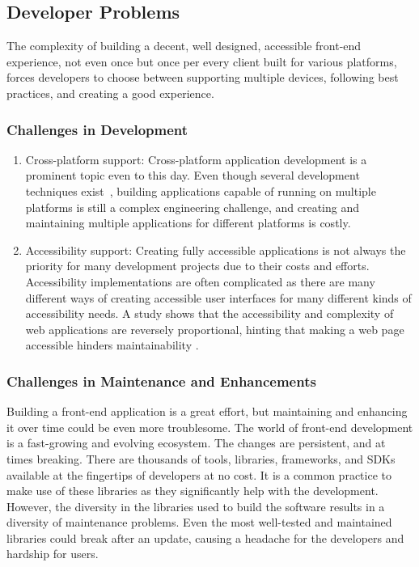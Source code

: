 \subsection{Developer Problems}

The complexity of building a decent, well designed, accessible front-end experience, not even once but once per every client built for various platforms, forces developers to choose between supporting multiple devices, following best practices, and creating a good experience.

\subsubsection{Challenges in Development}
\begin{enumerate}
  \item Cross-platform support:
  Cross-platform application development is a prominent topic even to this day. Even though several development techniques exist~\cite{PWAs}, building applications capable of running on multiple platforms is still a complex engineering challenge, and creating and maintaining multiple applications for different platforms is costly. 
  \item Accessibility support:
  Creating fully accessible applications is not always the priority for many development projects due to their costs and efforts. Accessibility implementations are often complicated as there are many different ways of creating accessible user interfaces for many different kinds of accessibility needs. A study shows that the accessibility and complexity of web applications are reversely proportional, hinting that making a web page accessible hinders maintainability \cite{WebNotForAll}.
\end{enumerate}

\subsubsection{Challenges in Maintenance and Enhancements}
Building a front-end application is a great effort, but maintaining and enhancing it over time could be even more troublesome. The world of front-end development is a fast-growing and evolving ecosystem. The changes are persistent, and at times breaking. There are thousands of tools, libraries, frameworks, and SDKs available at the fingertips of developers at no cost. It is a common practice to make use of these libraries as they significantly help with the development. However, the diversity in the libraries used to build the software results in a diversity of maintenance problems. Even the most well-tested and maintained libraries could break after an update, causing a headache for the developers and hardship for users.


